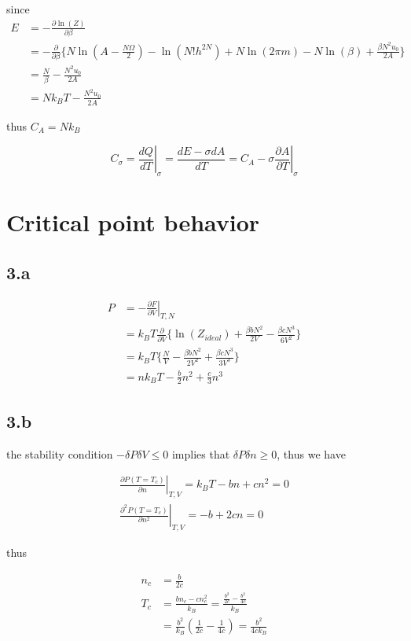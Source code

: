 \documentclass{article}
\begin{document}
since
$$
\begin{aligned}
    E &= -\frac{\partial \ln(Z)}{\partial \beta}\\
    &= -\frac{\partial}{\partial \beta} \{N\ln(A - \frac{N\Omega}{2}) - \ln(N!h^{2N}) + N\ln(2\pi m) - N\ln(\beta) + \frac{\beta N^2 u_0}{2A}\}\\
    &= \frac{N}{\beta} - \frac{N^2 u_0}{2A}\\
    &= Nk_B T - \frac{N^2 u_0}{2A}
\end{aligned}
$$

thus $C_A = N k_B$

$$
C_{\sigma} = \left.\frac{dQ}{dT}\right|_{\sigma} = \frac{dE - \sigma dA}{dT} = C_A - \sigma \left.\frac{\partial A}{\partial T}\right|_{\sigma}
$$

\section*{Critical point behavior}
\subsection*{3.a}

$$
\begin{aligned}
    P &= -\left.\frac{\partial F}{\partial V}\right|_{T, N}\\
    &= k_B T\frac{\partial}{\partial V} \{\ln(Z_{ideal}) + \frac{\beta b N^2}{2V} - \frac{\beta c N^3}{6V^2}\}\\
    &= k_B T \{\frac{N}{V} - \frac{\beta b N^2}{2V^2} + \frac{\beta c N^3}{3V^3}\}\\
    &= n k_B T - \frac{b}{2}n^2 + \frac{c}{3}n^3
\end{aligned}
$$

\subsection*{3.b}
the stability condition $-\delta P \delta V \leq 0$ implies that $\delta P \delta n \geq 0$, thus we have

$$
\begin{aligned}
    \left.\frac{\partial P(T=T_c)}{\partial n}\right|_{T, V} = k_B T - bn + cn^2 = 0\\
    \left.\frac{\partial^2 P(T=T_c)}{\partial n^2}\right|_{T, V} = -b + 2cn = 0
\end{aligned}
$$

thus

$$
\begin{aligned}
    n_c &= \frac{b}{2c}\\
    T_c &= \frac{bn_c - cn_c^2}{k_B} = \frac{\frac{b^2}{2c} - \frac{b^2}{4c}}{k_B}\\
        &= \frac{b^2}{k_B} (\frac{1}{2c} - \frac{1}{4c}) = \frac{b^2}{4c k_B}
\end{aligned}
$$
\end{document}
